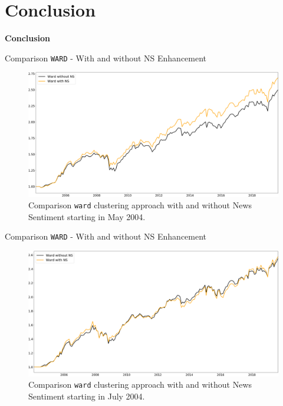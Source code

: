 
\section{Conclusion}
\begin{frame}[noframenumbering]
	\begin{center}
	    \textbf{\huge{Conclusion}}
	\end{center}
\end{frame}

\begin{frame}{Comparison \texttt{WARD} - With and without NS Enhancement}
\begin{figure}[h]
    \centering
    \includegraphics[width=\linewidth]{Figures/perf_noTC_ward_comp_F_2_B_0_LB_12_3_!!}
\caption{Comparison \texttt{ward} clustering approach with and without News Sentiment starting in May 2004.}
\end{figure}
\end{frame}

\begin{frame}{Comparison \texttt{WARD} - With and without NS Enhancement}
\begin{figure}[h]
    \centering
\includegraphics[width=\linewidth]{Figures/perf_noTC_ward_comp_F_2_B_0_LB_12_5_!!}
\caption{Comparison \texttt{ward} clustering approach with and without News Sentiment starting in July 2004.}
\end{figure}
\end{frame}

